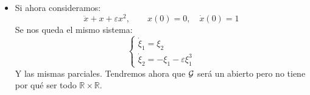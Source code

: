 \begin{ejemplo}
\begin{itemize}
            Tenemos en este caso:
            \begin{equation*}
                \cc{G} = \mathbb{R}\times \mathbb{R}
            \end{equation*}
            Puesto que la solución es la constantemente igual a 0, $x(t,\varepsilon) = 0\quad t\in \mathbb{R}$, por la condición inicial. Como conocemos la solución de forma explícita, no es necesario aplicar el Teorema, sino que podemos derivar directamente.
        \item Si ahora consideramos:
            \begin{equation*}
                \ddot{x} + x + \varepsilon x^2, \qquad x(0) = 0, \quad \dot{x}(0) = 1
            \end{equation*}
            Se nos queda el mismo sistema:
            \begin{equation*}
                \left\{\begin{array}{l}
                        \dot{\xi}_1 = \xi_2 \\
                        \dot{\xi}_2 = -\xi_1-\varepsilon\xi_1^3
                \end{array}\right.
            \end{equation*}
            Y las mismas parciales. Tendremos ahora que $\mathcal{G}$ será un abierto pero no tiene por qué ser todo $\mathbb{R}\times\mathbb{R}$.\\


\end{itemize}
\end{ejemplo}

